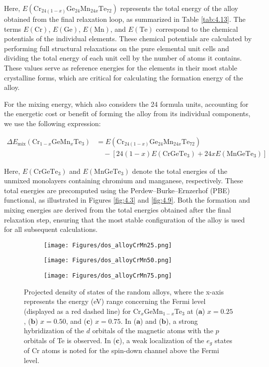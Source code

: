 Here, \(E(\text{Cr}_{24(1-x)}\text{Ge}_{24}\text{Mn}_{24x}\text{Te}_{72})\) represents the total energy of the alloy obtained from the final relaxation loop, as summarized in Table \ref{tab:4.13}. The terms \(E(\text{Cr})\), \(E(\text{Ge})\), \(E(\text{Mn})\), and \(E(\text{Te})\) correspond to the chemical potentials of the individual elements. These chemical potentials are calculated by performing full structural relaxations on the pure elemental unit cells and dividing the total energy of each unit cell by the number of atoms it contains. These values serve as reference energies for the elements in their most stable crystalline forms, which are critical for calculating the formation energy of the alloy.

For the mixing energy, which also considers the 24 formula units, accounting for the energetic cost or benefit of forming the alloy from its individual components, we use the following expression:

\begin{align*}
	\Delta E_{\text{mix}}(\text{Cr}_{1-x}\text{GeMn}_{x}\text{Te}_{3}) &= E(\text{Cr}_{24(1-x)}\text{Ge}_{24}\text{Mn}_{24x}\text{Te}_{72}) \\
	&\quad - \left[ 24(1-x)E(\text{CrGeTe}_{3}) + 24xE(\text{MnGeTe}_{3}) \right]
\end{align*}

Here, \(E(\text{CrGeTe}_{3})\) and \(E(\text{MnGeTe}_{3})\) denote the total energies of the unmixed monolayers containing chromium and manganese, respectively. These total energies are precomputed using the Perdew–Burke–Ernzerhof (PBE) functional, as illustrated in Figures \ref{fig:4.3} and \ref{fig:4.9}. Both the formation and mixing energies are derived from the total energies obtained after the final relaxation step, ensuring that the most stable configuration of the alloy is used for all subsequent calculations.

\begin{figure}[H]
	\centering
	\begin{subfigure}{.50\textwidth}
		\centering
		\texttt{[image: Figures/dos\_alloyCrMn25.png]}
	\end{subfigure}%
	\hfill %
	\begin{subfigure}{.50\textwidth}
		\centering
		\texttt{[image: Figures/dos\_alloyCrMn50.png]}
	\end{subfigure}
	\begin{subfigure}{.60\textwidth}
		\centering
		\texttt{[image: Figures/dos\_alloyCrMn75.png]}
	\end{subfigure}
	\caption{Projected density of states of the random alloys, where the x-axis represents the energy (eV) range concerning the Fermi level (displayed as a red dashed line) for Cr$_{x}$GeMn$_{1-x}$Te$_{3}$ at ($\mathbf{a}$) $x=0.25$, ($\mathbf{b}$) $x=0.50$, and ($\mathbf{c}$) $x=0.75$. In ($\mathbf{a}$) and ($\mathbf{b}$), a strong hybridization of the $d$ orbitals of the magnetic atoms with the $p$ orbitals of Te is observed. In ($\mathbf{c}$), a weak localization of the $e_{g}$ states of Cr atoms is noted for the spin-down channel above the Fermi level.}
	\label{fig:dosplotCrMnalloys}
\end{figure}

